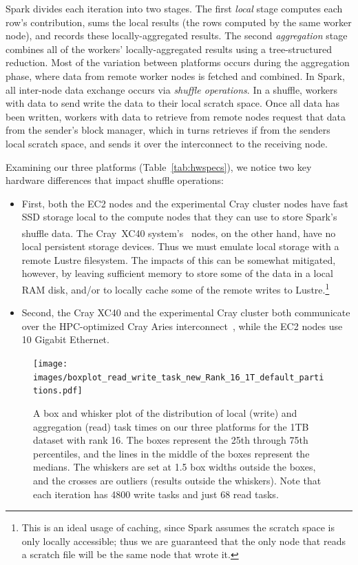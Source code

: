 Spark divides each iteration into two stages.  The first \emph{local} stage computes each row's contribution, sums the local results (the rows computed by the same worker node), and records these locally-aggregated results.  The second \emph{aggregation} stage combines all of the workers' locally-aggregated results using a tree-structured reduction.  Most of the variation between platforms occurs during the aggregation phase, where data from remote worker nodes is fetched and combined.  In Spark, all inter-node data exchange occurs via \emph{shuffle operations}.  In a shuffle, workers with data to send write the data to their local scratch space.  Once all data has been written, workers with data to retrieve from remote nodes request that data from the sender's block manager, which in turns retrieves if from the senders local scratch space, and sends it over the interconnect to the receiving node.

Examining our three platforms (Table~\ref{tab:hwspecs}), we notice two key hardware differences that impact shuffle operations:
\begin{itemize}
\item First, both the EC2 nodes and the experimental Cray cluster nodes have fast SSD storage local to the compute nodes that they can use to store Spark's shuffle data.  
The Cray{\textsuperscript{\tiny\textregistered}}~XC40{\textsuperscript{\tiny\texttrademark}} system's~\cite{alverson2012cray,craycascadesc12} nodes, on the other hand, have no local persistent storage devices.  Thus we must emulate local storage with a remote Lustre filesystem.  The impacts of this can be somewhat mitigated, however, by leaving sufficient memory to store some of the data in a local RAM disk, and/or to locally cache some of the remote writes to Lustre.\footnote{This is an ideal usage of caching, since Spark assumes the scratch space is only locally accessible; thus we are guaranteed that the only node that reads a scratch file will be the same node that wrote it.}
\item Second, the Cray XC40 and the experimental Cray cluster both communicate over the HPC-optimized Cray Aries 
interconnect~\cite{alverson2012cray,craycascadesc12}, while the EC2 nodes use 10 Gigabit Ethernet.
\end{itemize}  

   \begin{figure} [H]
    \begin{centering}
    \texttt{[image: images/boxplot\_read\_write\_task\_new\_Rank\_16\_1T\_default\_partitions.pdf]}
    \end{centering}
    \caption{A box and whisker plot of the distribution of local (write) and aggregation (read) task times on our three platforms for the 1TB dataset with rank 16.  The boxes represent the 25th through 75th percentiles, and the lines in the middle of the boxes represent the medians.  The whiskers are set at 1.5 box widths outside the boxes, and the crosses are outliers (results outside the whiskers).  Note that each iteration has 4800 write tasks and just 68 read tasks.}
    \label{fig:rwtaskdist} 
    \end{figure}

